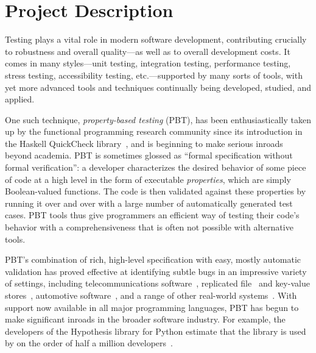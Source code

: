 \section*{Project Description}

\iflater{}\fi

Testing plays a vital role in modern software development,
contributing crucially to robustness and overall quality---as well as
to overall development costs.
%
It comes in many styles---unit testing, integration testing,
performance testing, stress testing, accessibility testing,
etc.---supported by many sorts of tools, with yet more advanced tools
and techniques continually being developed, studied, and applied.

One such technique, {\em property-based testing} (PBT), has been
enthusiastically taken up by the functional programming research
community since its introduction in the Haskell QuickCheck
library~\cite{ClaessenHughes00}, and is beginning to make
serious inroads beyond academia.
%
PBT is sometimes glossed as ``formal specification without formal
verification'': a developer characterizes the desired behavior of
some piece of code at a high level in the form of executable {\em
  properties}, which are simply Boolean-valued functions. The code is
then validated against these properties by running it over and over
with a large number of automatically generated test cases.
%
PBT tools thus give programmers an efficient way of testing their
code's behavior with a comprehensiveness that is often not
possible with alternative tools.

PBT's combination of rich, high-level specification with easy, mostly
automatic validation has proved effective at identifying subtle
bugs in an impressive variety of settings, including telecommunications
software~\cite{arts2006testing}, replicated
file~\cite{hughes2014mysteries} and key-value
stores~\cite{Bornholt2021}, automotive software~\cite{arts2015testing}, and a range
of other real-world systems~\cite{hughes2016experiences}. With support
now available in all major programming languages, PBT has
begun to make significant inroads in the broader software
industry. For example, the developers of the Hypothesis library for
Python estimate that the library is used by on the order of half a million
developers~\cite{ZacPersonalCommunication}.

\newcommand{\participant}[1]{{P#1}}


